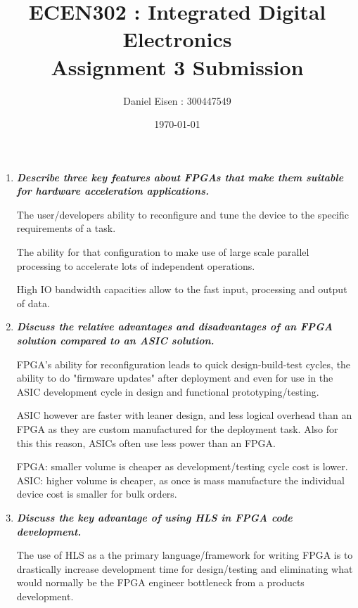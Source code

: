 \documentclass[11pt]{article}
\title{ECEN302 : Integrated Digital Electronics \\ Assignment 3 Submission}
\author{Daniel Eisen : 300447549}
\date{\today}
\begin{document}
\begin{preview}
    \maketitle
    \begin{enumerate}
        \item \textit{\textbf{Describe three key features about FPGAs that make them suitable for hardware acceleration applications.}}

              The user/developers ability to reconfigure and tune the device to the  specific requirements of a task.

              The ability for that configuration to make use of large scale parallel processing to accelerate lots of independent operations.

              High IO bandwidth capacities allow to the fast input, processing and output of data.

        \item \textit{\textbf{Discuss the relative advantages and disadvantages of an FPGA solution compared to an ASIC solution.}}

              FPGA's ability for reconfiguration leads to quick design-build-test cycles, the ability to do "firmware updates" after deployment and even for use in the ASIC development cycle in design and functional prototyping/testing.

              ASIC however are faster with leaner design, and less logical overhead than an FPGA as they are custom manufactured for the deployment task. Also for this this reason, ASICs often use less power than an FPGA.

              FPGA: smaller volume is cheaper as development/testing cycle cost is lower.
              ASIC: higher volume is cheaper, as once is mass manufacture the individual device cost is smaller for bulk orders.

        \item \textit{\textbf{Discuss the key advantage of using HLS in FPGA code development.}}

              The use of HLS as a the primary language/framework for writing FPGA is to drastically increase development time for design/testing and eliminating what would normally be the FPGA engineer bottleneck from a products development.


\end{enumerate}
\end{preview}
\end{document}
